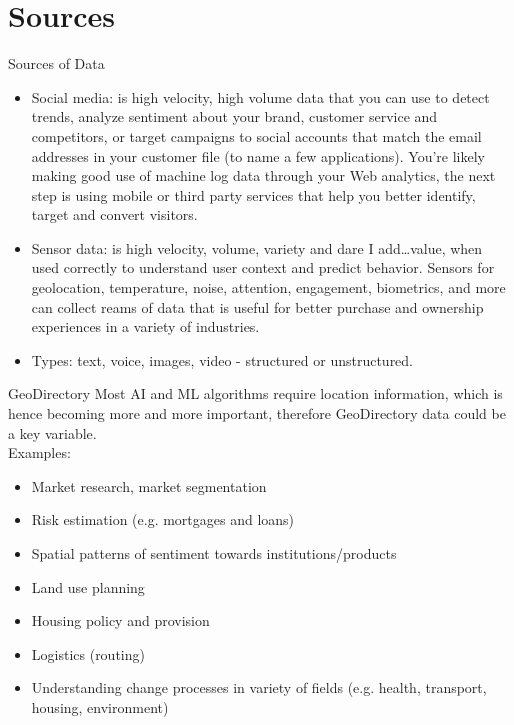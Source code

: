 \documentclass{beamer}
\begin{document}
\section{Sources}
\begin{frame}{Sources of Data}
\begin{itemize}
\item Social media: is high velocity, high volume data that you can use to detect trends, analyze sentiment about your brand, customer service and competitors, or target campaigns to social accounts that match the email addresses in your customer file (to name a few applications).
You’re likely making good use of machine log data through your Web analytics, the next step is using mobile or third party services that help you better identify, target and convert visitors.
\item Sensor data: is high velocity, volume, variety and dare I add…value, when used correctly to understand user context and predict behavior. Sensors for geolocation, temperature, noise, attention, engagement, biometrics, and more can collect reams of data that is useful for better purchase and ownership experiences in a variety of industries.
\item Types: text, voice, images, video - structured or unstructured.
\end{itemize}
\end{frame}

\begin{frame}{GeoDirectory}
Most AI and ML algorithms require location information, which is hence becoming more and more important, therefore GeoDirectory data could be a key variable. \\ \vspace{.5cm}
Examples:
\begin{itemize}
\item Market research, market segmentation 
\item Risk estimation (e.g. mortgages and loans)
\item Spatial patterns of sentiment towards institutions/products 
\item Land use planning 
\item Housing policy and provision
\item Logistics (routing) 
\item Understanding change processes in variety of fields (e.g. health, transport, housing, environment) 
\end{itemize}
\end{frame}
\end{document}
